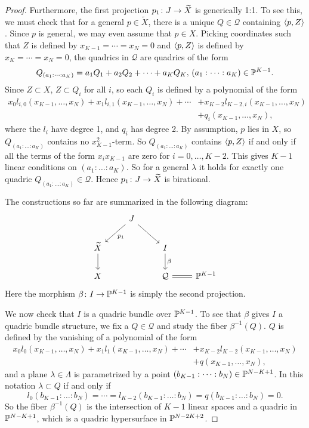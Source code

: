 \begin{proof}
 Furthermore, the first projection $p_1 \from J \to \widetilde{X}$ is generically 1:1. To see this, we must check that for a general $p \in \widetilde{X}$, there is a unique $Q \in \mathcal{Q}$ containing $\ip{p,Z}$. Since $p$ is general, we may even assume that $p \in X$. Picking coordinates such that $Z$ is defined by $x_{K-1} = \cdots = x_N = 0$ and $\ip{p,Z}$ is defined by $x_{K} = \cdots = x_N = 0$, the quadrics in $\mathcal{Q}$ are quadrics of the form
\[Q_{(a_1:\dots:a_K)} = a_1 Q_1 + a_2 Q_2 + \cdots + a_K Q_K, \, (a_1:\dots:a_K) \in \P^{K-1}.\]
Since $Z \subset X$, $Z \subset Q_i$ for all $i$, so each $Q_i$ is defined by a polynomial of the form
\begin{align*}
	x_0l_{i,0}(x_{K-1},\dots,x_N) + x_1l_{i,1}(x_{K-1},\dots,x_N) + \cdots &+ x_{K-2}l_{K-2,i}(x_{K-1},\dots,x_N) \\
	 &+ q_i(x_{K-1},\dots,x_N),
\end{align*}
where the $l_i$ have degree 1, and $q_i$ has degree 2. By assumption, $p$ lies in $X$, so $Q_{(a_1:\dots:a_K)}$ contains no $x_{K-1}^2$-term. So $Q_{(a_1:\dots:a_K)}$ contains $\ip{p,Z}$ if and only if all the terms of the form $x_ix_{K-1}$ are zero for $i = 0,\dots,K-2$. This gives $K-1$ linear conditions on $(a_1:\dots:a_K)$. So for a general $\lambda$ it holds for exactly one quadric $Q_{(a_1:\dots:a_K)} \in \mathcal{Q}$. Hence $p_1 \from J \to \widetilde{X}$ is birational.

The constructions so far are summarized in the following diagram:
\begin{equation*}
  \begin{tikzcd}
    & J \arrow["p_1",dl] \arrow[dr]&  &\\
  \widetilde{X} \arrow[d] & & I \arrow[d,"\beta"] &\\
  X             & & \mathcal{Q} \arrow[r,equal] & \P^{K-1}
  \end{tikzcd}
\end{equation*}
Here the morphism $\beta \from I \to \P^{K-1}$ is simply the second projection.

We now check that $I$ is a quadric bundle over $\P^{K-1}$. To see that $\beta$ gives $I$ a quadric bundle structure, we fix a $Q \in \mathcal{Q}$ and study the fiber $\beta^{-1}(Q)$. $Q$ is defined by the vanishing of a polynomial of the form
\begin{align*}
	x_0l_0(x_{K-1},\dots,x_N) + x_1l_1(x_{K-1},\dots,x_N) + \cdots &+ x_{K-2}l_{K-2}(x_{K-1},\dots,x_N)\\
	&+ q(x_{K-1},\dots,x_N),
\end{align*}
and a plane $\lambda \in \Lambda$ is parametrized by a point $(b_{K-1}:\cdots : b_N) \in \P^{N-K+1}$. In this notation $\lambda \subset Q$ if and only if 
\[l_0(b_{K-1}:\dots : b_N) = \cdots = l_{K-2}(b_{K-1}:\dots : b_N) = q(b_{K-1}:\dots : b_N) = 0. \]
So the fiber $\beta^{-1}(Q)$ is the intersection of $K-1$ linear spaces and a quadric in $\P^{N-K+1}$, which is a quadric hypersurface in $\P^{N-2K+2}$.


\end{proof}
